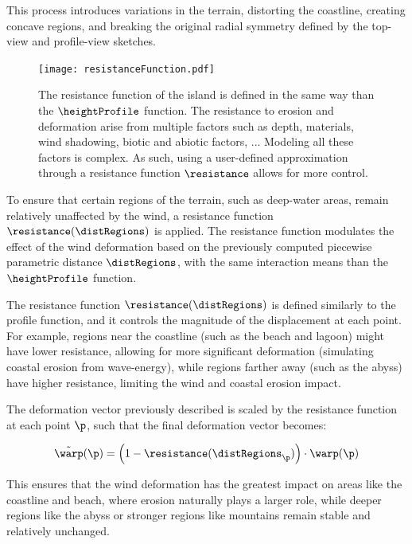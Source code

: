 This process introduces variations in the terrain, distorting the coastline, creating concave regions, and breaking the original radial symmetry defined by the top-view and profile-view sketches.


\begin{figure}[H]
	\centering
	\texttt{[image: resistanceFunction.pdf]}
    \caption{The resistance function of the island is defined in the same way than the $\heightProfile$ function. The resistance to erosion and deformation arise from multiple factors such as depth, materials, wind shadowing, biotic and abiotic factors, ... Modeling all these factors is complex. As such, using a user-defined approximation through a resistance function $\resistance$ allows for more control. }
    \label{fig:coral-island-resistance-function}
\end{figure}

To ensure that certain regions of the terrain, such as deep-water areas, remain relatively unaffected by the wind, a resistance function $\resistance(\distRegions)$ is applied. The resistance function modulates the effect of the wind deformation based on the previously computed piecewise parametric distance $\distRegions$, with the same interaction means than the $\heightProfile$ function.

The resistance function $\resistance(\distRegions)$ is defined similarly to the profile function, and it controls the magnitude of the displacement at each point. For example, regions near the coastline (such as the beach and lagoon) might have lower resistance, allowing for more significant deformation (simulating coastal erosion from wave-energy), while regions farther away (such as the abyss) have higher resistance, limiting the wind and coastal erosion impact.

The deformation vector previously described is scaled by the resistance function at each point $\p$, such that the final deformation vector becomes:

\begin{align}
    \Tilde{\warp}(\p) = \left(1 - \resistance(\distRegions_\p) \right) \cdot \warp(\p)
\end{align}

This ensures that the wind deformation has the greatest impact on areas like the coastline and beach, where erosion naturally plays a larger role, while deeper regions like the abyss or stronger regions like mountains remain stable and relatively unchanged.

